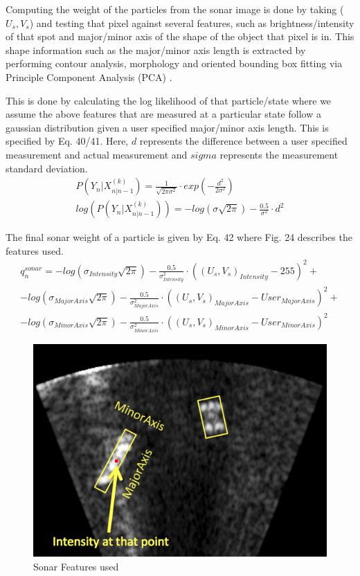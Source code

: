 \documentclass[15pt]{article}
\begin{document}
Computing the weight of the particles from the sonar image is done by taking ($U_{s}, V_{s}$) and testing that pixel against several features, such as brightness/intensity of that spot and major/minor axis of the shape of the object that pixel is in. This shape information such as the major/minor axis length is extracted by performing contour analysis, morphology and oriented bounding box fitting via Principle Component Analysis (PCA) \cite{Knauer2006}.

This is done by calculating the log likelihood of that particle/state where we assume the above features that are measured at a particular state follow a gaussian distribution given a user specified major/minor axis length. This is specified by Eq. 40/41. Here, $d$ represents the difference between a user specified measurement and actual measurement and $sigma$ represents the measurement standard deviation.
\begin{gather}
P(Y_{n}|X_{n|n-1}^{(k)})=\frac{1}{\sqrt{2\pi\sigma^{2}}}\cdot exp(-\frac{d^{2}}{2\sigma^{2}}) \\
log(P(Y_{n}|X_{n|n-1}^{(k)}))=-log(\sigma\sqrt{2\pi})-\frac{0.5}{\sigma^{2}}\cdot d^{2}
\end{gather}

The final sonar weight of a particle is given by Eq. 42 where Fig. 24 describes the features used.
\begin{gather}
q_{n}^{sonar}=-log(\sigma_{Intensity}\sqrt{2\pi})-\frac{0.5}{\sigma_{Intensity}^{2}}\cdot((U_{s},V_{s})_{Intensity}-255)^{2}+ \nonumber\\
-log(\sigma_{MajorAxis}\sqrt{2\pi})-\frac{0.5}{\sigma_{MajorAxis}^{2}}\cdot((U_{s},V_{s})_{MajorAxis}-User_{MajorAxis})^{2}+ \nonumber\\
-log(\sigma_{MinorAxis}\sqrt{2\pi})-\frac{0.5}{\sigma_{MinorAxis}^{2}}\cdot((U_{s},V_{s})_{MinorAxis}-User_{MinorAxis})^{2}
\end{gather}

\begin{figure}[h!]
  \centering
  \includegraphics[scale=0.3]{majorminor}
  \captionsetup{justification=centering}
  \caption{Sonar Features used}
\end{figure}
\end{document}
